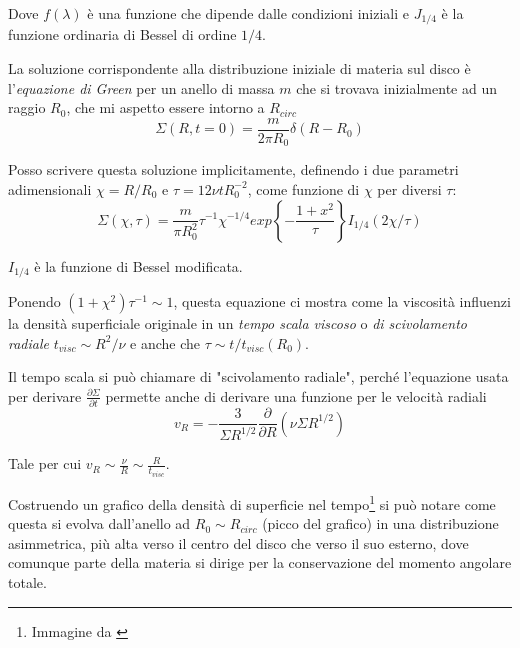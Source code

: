 \documentclass[a4paperbi]{article}
\begin{document}
	Dove $f(\lambda)$ è una funzione che dipende dalle condizioni iniziali e $J_{1/4}$ è la funzione ordinaria di Bessel di ordine $1/4$.
	
	La soluzione corrispondente alla distribuzione iniziale di materia sul disco è l'\textit{equazione di Green} per un anello di massa $m$ che si trovava inizialmente ad un raggio $R_0$, che mi aspetto essere intorno a $R_{circ}$
	\begin{equation}
		\Sigma(R,t=0)=\frac{m}{2\pi R_0}\delta(R-R_0)
	\end{equation}
	
	Posso scrivere questa soluzione implicitamente, definendo i due parametri adimensionali $\chi=R/R_0$ e $\tau=12\nu tR_0^{-2}$, come funzione di $\chi$ per diversi $\tau$:
	\begin{equation}
	\Sigma(\chi,\tau)=\frac{m}{\pi R_0^2}\tau^{-1}\chi^{-1/4}exp\left\{-\frac{1+x^2}{\tau}\right\}I_{1/4}(2\chi/\tau)
	\end{equation}
	
	$I_{1/4}$ è la funzione di Bessel modificata.
	
	Ponendo $(1+\chi^2)\tau^{-1}\sim 1$, questa equazione ci mostra come la viscosità influenzi la densità superficiale originale in un \textit{tempo scala viscoso} o \textit{di scivolamento radiale} $t_{visc}\sim R^2/\nu$ e anche che $\tau\sim t/t_{visc}(R_0)$.
	
	Il tempo scala si può chiamare di "scivolamento radiale", perché l'equazione usata per derivare $\frac{\partial\Sigma}{\partial t}$ permette anche di derivare una funzione per le velocità radiali
	\begin{equation}
		v_R=-\frac{3}{\Sigma R^{1/2}}\frac{\partial}{\partial R}(\nu\Sigma R^{1/2})
	\end{equation}
	
	Tale per cui $v_R\sim\frac{\nu}{R}\sim\frac{R}{t_{visc}}$.
	
	Costruendo un grafico della densità di superficie nel tempo\footnote{Immagine da \cite{Pringle1981}} si può notare come questa si evolva dall'anello ad $R_0\sim R_{circ}$ (picco del grafico) in una distribuzione asimmetrica, più alta verso il centro del disco che verso il suo esterno, dove comunque parte della materia si dirige per la conservazione del momento angolare totale.
	
\end{document}
